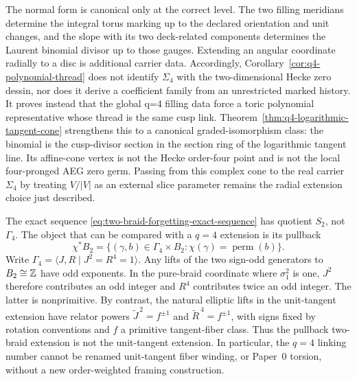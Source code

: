 The normal form is canonical only at the correct level.  The two filling
meridians determine the integral torus marking up to the declared orientation
and unit changes, and the slope with its two deck-related components determines
the Laurent binomial divisor up to those gauges.  Extending an angular coordinate
radially to a disc is additional carrier data.  Accordingly,
Corollary~\ref{cor:q4-polynomial-thread} does not identify $\Sigma_4$ with the
two-dimensional Hecke zero dessin, nor does it derive a coefficient family from
an unrestricted marked history.  It proves instead that the global q=4 filling
data force a toric polynomial representative whose thread is the same cusp link.
Theorem~\ref{thm:q4-logarithmic-tangent-cone} strengthens this to a canonical
graded-isomorphism class: the binomial is the cusp-divisor section in the section
ring of the logarithmic tangent line.  Its affine-cone vertex is not the Hecke
order-four point and is not the local four-pronged AEG zero germ.  Passing from
this complex cone to the real carrier $\Sigma_4$ by treating $V/|V|$ as an
external slice parameter remains the radial extension choice just described.

\begin{warning}
\label{warn:q4-braid-versus-unit-tangent-extension}
The exact sequence \eqref{eq:two-braid-forgetting-exact-sequence} has quotient
$S_2$, not $\Gamma_4$.  The object that can be compared with a $q=4$ extension
is its pullback
\begin{equation}
 \chi^*B_2
 =\{(\gamma,b)\in\Gamma_4\times B_2:
       \chi(\gamma)=\operatorname{perm}(b)\}.
 \label{eq:q4-pullback-two-braid-extension}
\end{equation}
Write $\Gamma_4=\langle J,R\mid J^2=R^4=1\rangle$.  Any lifts of the two
sign-odd generators to $B_2\cong\mathbb{Z}$ have odd exponents.  In the pure-braid
coordinate where $\sigma_1^2$ is one, $J^2$ therefore contributes an odd
integer and $R^4$ contributes twice an odd integer.  The latter is nonprimitive.
By contrast, the natural elliptic lifts in the unit-tangent extension have
relator powers $\widetilde J^{\,2}=f^{\pm1}$ and
$\widetilde R^{\,4}=f^{\pm1}$, with signs fixed by rotation conventions and
$f$ a primitive tangent-fiber class.  Thus the pullback two-braid extension is
not the unit-tangent extension.  In particular, the $q=4$ linking number cannot
be renamed unit-tangent fiber winding, or Paper~0 torsion, without a new
order-weighted framing construction.
\end{warning}

